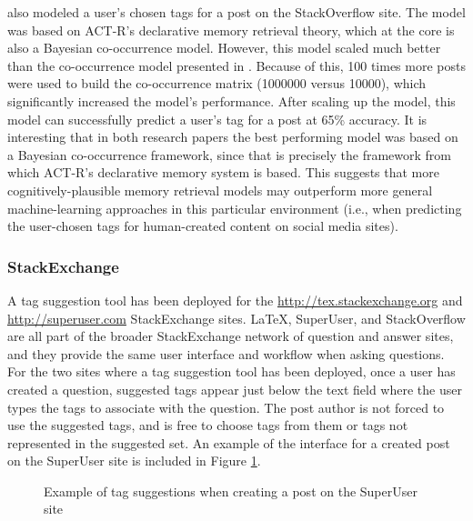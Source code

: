 \documentclass[man,floatsintext,donotrepeattitle]{apa6}
\begin{document}
\textcite{Stanley2013} also modeled a user's chosen tags for a post on the StackOverflow site.
The model was based on ACT-R's declarative memory retrieval theory, which at the core is also a Bayesian co-occurrence model.
However, this model scaled much better than the co-occurrence model presented in \textcite{Kuo2011}.
Because of this, 100 times more posts were used to build the co-occurrence matrix (\num{1000000} versus \num{10000}), which significantly increased the model's performance.
After scaling up the model, this model can successfully predict a user's tag for a post at 65\% accuracy.
It is interesting that in both research papers the best performing model was based on a Bayesian co-occurrence framework, since that is precisely the framework from which ACT-R's declarative memory system is based.
This suggests that more cognitively-plausible memory retrieval models may outperform more general machine-learning approaches in this particular environment
(i.e., when predicting the user-chosen tags for human-created content on social media sites).

\subsubsection{StackExchange}

A tag suggestion tool has been deployed for the \url{http://tex.stackexchange.org} \parencite{LatexTags2013} and \url{http://superuser.com} \parencite{SuperUserTags2013} StackExchange sites.
\LaTeX, SuperUser, and StackOverflow are all part of the broader StackExchange network of question and answer sites, and they provide the same user interface and workflow when asking questions.
For the two sites where a tag suggestion tool has been deployed, once a user has created a question, suggested tags appear just below the text field where the user types the tags to associate with the question.
The post author is not forced to use the suggested tags, and is free to choose tags from them or tags not represented in the suggested set.
An example of the interface for a created post on the SuperUser site is included in Figure \ref{figSuperUserSuggestion}.

\begin{figure}[!htbp]
  \caption{Example of tag suggestions when creating a post on the SuperUser site}
  \label{figSuperUserSuggestion}
\end{figure}
\end{document}
